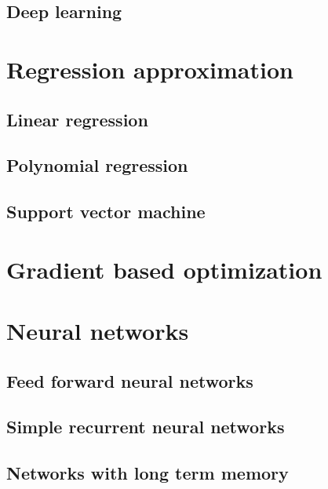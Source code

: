 \subsection{Deep learning}

\section{Regression approximation}

\subsection{Linear regression}

\subsection{Polynomial regression}

\subsection{Support vector machine}


\section{Gradient based optimization}

\section{Neural networks}

\subsection{Feed forward neural networks}

\subsection{Simple recurrent neural networks}

\subsection{Networks with long term memory}

